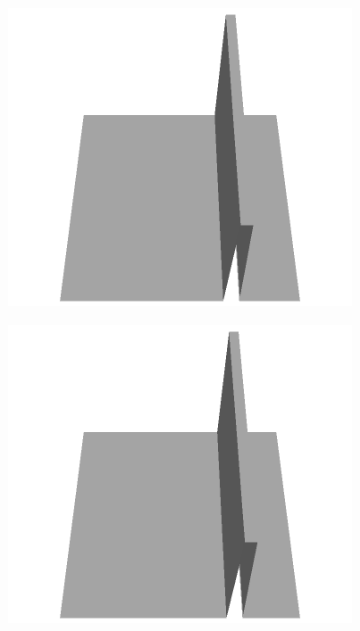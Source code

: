 \documentclass[../document.tex]{subfiles}
\begin{document}
\begin{figure}[H]
\begin{subfigure}[b]{0.065\textwidth}
    \includegraphics[width=\linewidth]{../img/5/custom_patches/walls_front/all/39-3d.png}
    \end{subfigure}
    \begin{subfigure}[b]{0.065\textwidth}
    \includegraphics[width=\linewidth]{../img/5/custom_patches/walls_front/all/38-3d.png}
    \end{subfigure}
    \begin{subfigure}[b]{0.065\textwidth}

\end{subfigure}
\end{figure}
\end{document}
